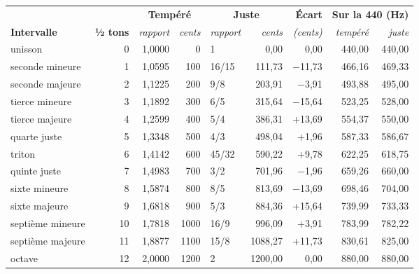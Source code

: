 
\begin{tabular}{@{}l r r r l r r r r@{}}
\toprule
 & & \multicolumn{2}{c}{\textbf{Tempéré}} & \multicolumn{2}{c}{\textbf{Juste}} & \textbf{Écart} & \multicolumn{2}{c}{\textbf{Sur la 440 (Hz)}} \\
\cmidrule(lr){3-4}\cmidrule(lr){5-6}\cmidrule(l){8-9}
\textbf{Intervalle} & \textbf{½ tons} & \textit{rapport} & \textit{cents} & \textit{rapport} & \textit{cents} & \textit{(cents)} & \textit{tempéré} & \textit{juste} \\
\midrule
unisson & 0 & 1{,}0000 & 0 & 1 & 0{,}00 & 0{,}00 & 440{,}00 & 440{,}00 \\
seconde mineure & 1 & 1{,}0595 & 100 & 16/15 & 111{,}73 & $-$11{,}73 & 466{,}16 & 469{,}33 \\
seconde majeure & 2 & 1{,}1225 & 200 & 9/8 & 203{,}91 & $-$3{,}91 & 493{,}88 & 495{,}00 \\
tierce mineure & 3 & 1{,}1892 & 300 & 6/5 & 315{,}64 & $-$15{,}64 & 523{,}25 & 528{,}00 \\
tierce majeure & 4 & 1{,}2599 & 400 & 5/4 & 386{,}31 & +13{,}69 & 554{,}37 & 550{,}00 \\
quarte juste & 5 & 1{,}3348 & 500 & 4/3 & 498{,}04 & +1{,}96 & 587{,}33 & 586{,}67 \\
triton & 6 & 1{,}4142 & 600 & 45/32 & 590{,}22 & +9{,}78 & 622{,}25 & 618{,}75 \\
quinte juste & 7 & 1{,}4983 & 700 & 3/2 & 701{,}96 & $-$1{,}96 & 659{,}26 & 660{,}00 \\
sixte mineure & 8 & 1{,}5874 & 800 & 8/5 & 813{,}69 & $-$13{,}69 & 698{,}46 & 704{,}00 \\
sixte majeure & 9 & 1{,}6818 & 900 & 5/3 & 884{,}36 & +15{,}64 & 739{,}99 & 733{,}33 \\
septième mineure & 10 & 1{,}7818 & 1000 & 16/9 & 996{,}09 & +3{,}91 & 783{,}99 & 782{,}22 \\
septième majeure & 11 & 1{,}8877 & 1100 & 15/8 & 1088{,}27 & +11{,}73 & 830{,}61 & 825{,}00 \\
octave & 12 & 2{,}0000 & 1200 & 2 & 1200{,}00 & 0{,}00 & 880{,}00 & 880{,}00 \\
\bottomrule
\end{tabular}
